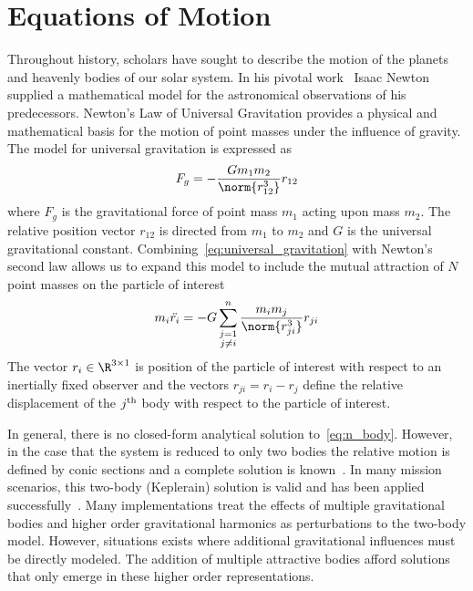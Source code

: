 \section{Equations of Motion}\label{sec:crtbp}
Throughout history, scholars have sought to describe the motion of the planets and heavenly bodies of our solar system.
In his pivotal work~\cite{newton1999} Isaac Newton supplied a mathematical model for the astronomical observations of his predecessors.
Newton's Law of Universal Gravitation provides a physical and mathematical basis for the motion of point masses under the influence of gravity. 
The model for universal gravitation is expressed as
\begin{equation}
	F_g = - \frac{G m_1 m_2}{\norm{r_{12}^3}} r_{12}
	\label{eq:universal_gravitation}
\end{equation}
where \( F_g\) is the gravitational force of point mass \(m_1\) acting upon mass \( m_2\).
The relative position vector \( r_{12} \) is directed from \( m_1\) to \(m_2\) and \( G\) is the universal gravitational constant.
Combining~\eqref{eq:universal_gravitation} with Newton's second law allows us to expand this model to include the mutual attraction of \( N \) point masses on the particle of interest
\begin{equation}
	m_i \ddot{r_i} = -G \sum_{\substack{j=1 \\ j\neq i}}^n \frac{m_i m_j}{\norm{r_{ji}^3}} r_{ji}
	\label{eq:n_body}
\end{equation}
The vector \( r_i \in \R^{3\times1}\) is position of the particle of interest with respect to an inertially fixed observer and the vectors \( r_{ji} = r_i - r_j \) define the relative displacement of the \( j\textsuperscript{th}\) body with respect to the particle of interest.

In general, there is no closed-form analytical solution to~\eqref{eq:n_body}.
However, in the case that the system is reduced to only two bodies the relative motion is defined by conic sections and a complete solution is known~\cite{bate1971}.
In many mission scenarios, this two-body (Keplerain) solution is valid and has been applied successfully~\cite{vallado2001}.
Many implementations treat the effects of multiple gravitational bodies and higher order gravitational harmonics as perturbations to the two-body model. 
However, situations exists where additional gravitational influences must be directly modeled.
The addition of multiple attractive bodies afford solutions that only emerge in these higher order representations.

